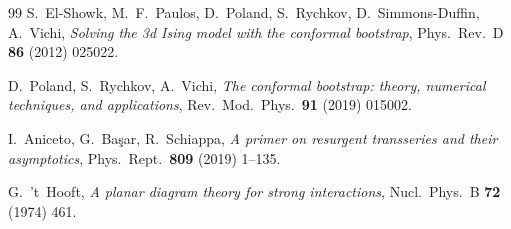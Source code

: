 {\begin{thebibliography}{99}
 S.~El-Showk, M.~F.~Paulos, D.~Poland, S.~Rychkov, D.~Simmons-Duffin,
  A.~Vichi, \emph{Solving the 3d Ising model with the conformal bootstrap}, Phys.\ Rev.\ D
  \textbf{86} (2012) 025022.

 D.~Poland, S.~Rychkov, A.~Vichi, \emph{The conformal bootstrap: theory, numerical
  techniques, and applications}, Rev.\ Mod.\ Phys.\ \textbf{91} (2019) 015002.

 I.~Aniceto, G.~Ba\c{s}ar, R.~Schiappa, \emph{A primer on resurgent transseries and
  their asymptotics}, Phys.\ Rept.\ \textbf{809} (2019) 1--135.

 G.~'t~Hooft, \emph{A planar diagram theory for strong interactions},
  Nucl.\ Phys.\ B \textbf{72} (1974) 461.

\end{thebibliography}
}
